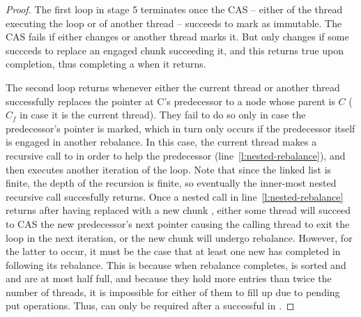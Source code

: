 \begin{proof}
The first loop in stage 5 terminates once the CAS -- either of the thread executing the loop or of another thread -- succeeds to mark  as immutable. 
The CAS fails if either  changes or another thread marks it.  
But   only changes if some  succceds to replace an engaged chunk succeeding it, and this   
returns true upon completion, thus completing a  when it returns. 

The second loop returns whenever either the current thread or another thread successfully replaces the  pointer at C's predecessor to 
a node whose parent is $C$ ($C_f$ in case it is the current thread). 
They fail to do so only in case the predecessor's   pointer is marked, which in turn only occurs if the predecessor itself is engaged in 
another rebalance. In this case, the current thread makes a recursive call to   in order to help the predecessor (line~\ref{l:nested-rebalance}), 
and then executes another iteration of the loop. 
Note that since the linked list is finite, the depth of the recursion is finite, so eventually the inner-most nested recursive call succesfully returns. 
Once a nested call in line~\ref{l:nested-rebalance} returns after having replaced  with a new chunk , 
either some thread will succeed to CAS the new predecessor's next pointer causing 
the calling thread to exit the loop in the next iteration, or  the new chunk   will undergo rebalance.
However, for the latter to occur, it must be the case that at least one new   has completed in   following its rebalance.
This is because when rebalance completes,  is sorted and   and  are at most half full, and 
because they hold more entries than twice the number of threads,   it is impossible for either of them to fill up due to pending put operations. 
Thus,  can only be required after a successful    in   .

\end{proof}
